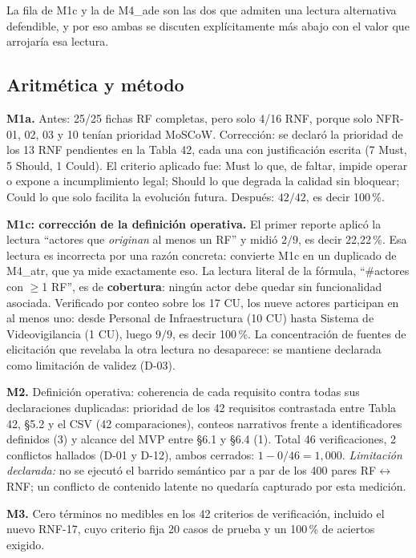 La fila de M1c y la de M4\_ade son las dos que admiten una lectura alternativa defendible, y por eso ambas se discuten expl\'icitamente m\'as abajo con el valor que arrojar\'ia esa lectura.

\subsection{Aritm\'etica y m\'etodo}

\textbf{M1a.} Antes: 25/25 fichas RF completas, pero solo 4/16 RNF, porque solo NFR-01, 02, 03 y 10 ten\'ian prioridad MoSCoW. Correcci\'on: se declar\'o la prioridad de los 13 RNF pendientes en la Tabla 42, cada una con justificaci\'on escrita (7 Must, 5 Should, 1 Could). El criterio aplicado fue: Must lo que, de faltar, impide operar o expone a incumplimiento legal; Should lo que degrada la calidad sin bloquear; Could lo que solo facilita la evoluci\'on futura. Despu\'es: $42/42$, es decir 100\,\%.

\textbf{M1c: correcci\'on de la definici\'on operativa.} El primer reporte aplic\'o la lectura ``actores que \emph{originan} al menos un RF'' y midi\'o $2/9$, es decir 22,22\,\%. Esa lectura es incorrecta por una raz\'on concreta: convierte M1c en un duplicado de M4\_atr, que ya mide exactamente eso. La lectura literal de la f\'ormula, ``\#actores con $\geq$1 RF'', es de \textbf{cobertura}: ning\'un actor debe quedar sin funcionalidad asociada. Verificado por conteo sobre los 17 CU, los nueve actores participan en al menos uno: desde Personal de Infraestructura (10 CU) hasta Sistema de Videovigilancia (1 CU), luego $9/9$, es decir 100\,\%. La concentraci\'on de fuentes de elicitaci\'on que revelaba la otra lectura no desaparece: se mantiene declarada como limitaci\'on de validez (D-03).

\textbf{M2.} Definici\'on operativa: coherencia de cada requisito contra todas sus declaraciones duplicadas: prioridad de los 42 requisitos contrastada entre Tabla 42, \S5.2 y el CSV (42 comparaciones), conteos narrativos frente a identificadores definidos (3) y alcance del MVP entre \S6.1 y \S6.4 (1). Total 46 verificaciones, 2 conflictos hallados (D-01 y D-12), ambos cerrados: $1-0/46 = 1{,}000$. \emph{Limitaci\'on declarada:} no se ejecut\'o el barrido sem\'antico par a par de los 400 pares RF$\leftrightarrow$RNF; un conflicto de contenido latente no quedar\'ia capturado por esta medici\'on.

\textbf{M3.} Cero t\'erminos no medibles en los 42 criterios de verificaci\'on, incluido el nuevo RNF-17, cuyo criterio fija 20 casos de prueba y un 100\,\% de aciertos exigido.

